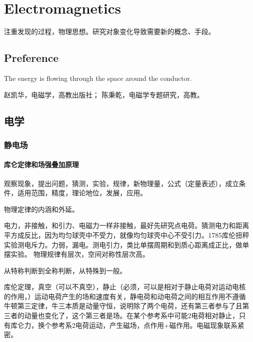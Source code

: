 

\chapter{Electromagnetics}

注重发现的过程，物理思想。研究对象变化导致需要新的概念、手段。

\section{Preference}

The energy is flowing through the space around the conductor.

赵凯华，电磁学，高教出版社；
陈秉乾，电磁学专题研究，高教。

\section{电学}

\subsection{静电场}

\subsubsection{库仑定律和场强叠加原理}

观察现象，提出问题，猜测，实验，规律，新物理量，公式（定量表述），成立条件，适用范围，精度，理论地位，发展，应用。 

物理定律的内涵和外延。

电力，非接触，和引力、电磁力一样非接触，最好先研究点电荷。猜测电力和距离平方成反比，因为均匀球壳中不受力，就像均匀球壳中心不受引力。1785库伦扭秤实验测电斥力。力弱，漏电。测电引力，类比单摆周期和到质心距离成正比，做单摆实验。
物理规律有层次，空间对称性层次高。

从特称判断到全称判断，从特殊到一般。

库伦定理，真空（可以不真空），静止（必须，可以是相对于静止电荷对运动电核的作用，）运动电荷产生的场和速度有关，静电荷和动电荷之间的相互作用不遵循牛顿第三定律，牛三本质是动量守恒，说明除了两个电荷，还有第三者参与了且第三者的动量也变化了，这个第三者是场。在某个参考系中可能2电荷相对静止，只有库仑力，换个参考系2电荷运动，产生磁场，点作用+磁作用。电磁现象联系紧密。

